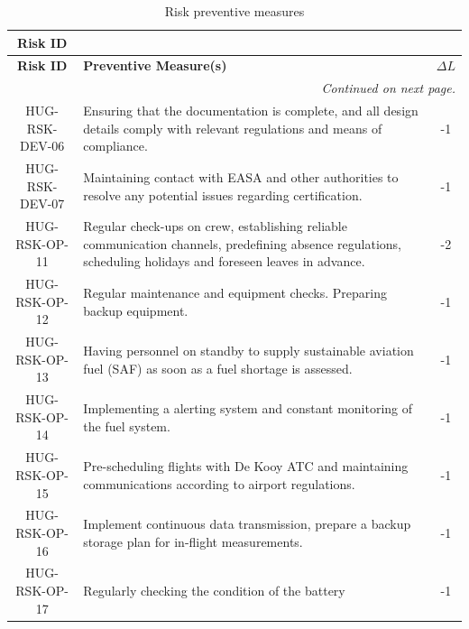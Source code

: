 \begin{longtable}{|c|p{12.5cm}|c|}
\caption{Risk preventive measures}
\label{tab:risk_preventive_measures} \\

\hline
\textbf{Risk ID} & \centering{\textbf{Preventive Measure(s)}} & \centering{\textbf{$\Delta L$}} \tabularnewline
\hline\hline
\endfirsthead

\hline
\textbf{Risk ID} & \textbf{Preventive Measure(s)} & \textbf{$\Delta L$} \\
\hline\hline
\endhead

\hline
\multicolumn{3}{r}{\textit{Continued on next page.}} \\
\endfoot

\hline
\endlastfoot

HUG-RSK-DEV-06 & Ensuring that the documentation is complete, and all design details comply with relevant regulations and means of compliance.
& -1 \\ \hline

HUG-RSK-DEV-07 & Maintaining contact with EASA and other authorities to resolve any potential issues regarding certification.
& -1 \\ \hline

HUG-RSK-OP-11 & Regular check-ups on crew, establishing reliable communication channels, predefining absence regulations, scheduling holidays and foreseen leaves in advance.
& -2 \\ \hline

HUG-RSK-OP-12 & Regular maintenance and equipment checks. Preparing backup equipment.
& -1 \\ \hline

HUG-RSK-OP-13 & Having personnel on standby to supply sustainable aviation fuel (SAF) as soon as a fuel shortage is assessed.
& -1 \\ \hline

HUG-RSK-OP-14 & Implementing a alerting system and constant monitoring of the fuel system.
& -1 \\ \hline

HUG-RSK-OP-15 & Pre-scheduling flights with De Kooy ATC and maintaining communications according to airport regulations.
& -1 \\ \hline

HUG-RSK-OP-16 & Implement continuous data transmission, prepare a backup storage plan for in-flight measurements.
& -1 \\ \hline

HUG-RSK-OP-17 & 
Regularly checking the condition of the battery
& -1 \\

\end{longtable}

